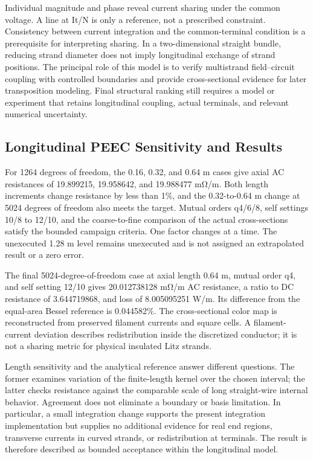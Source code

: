 \documentclass[journal,10pt]{IEEEtran}
\begin{document}
Individual magnitude and phase reveal current sharing under the common voltage. A line at It/N is only a reference, not a prescribed constraint. Consistency between current integration and the common-terminal condition is a prerequisite for interpreting sharing. In a two-dimensional straight bundle, reducing strand diameter does not imply longitudinal exchange of strand positions. The principal role of this model is to verify multistrand field–circuit coupling with controlled boundaries and provide cross-sectional evidence for later transposition modeling. Final structural ranking still requires a model or experiment that retains longitudinal coupling, actual terminals, and relevant numerical uncertainty.


\subsection*{Longitudinal PEEC Sensitivity and Results}
\hypertarget{03.peec_results.heading}{}
For 1264 degrees of freedom, the 0.16, 0.32, and 0.64 m cases give axial AC resistances of 19.899215, 19.958642, and 19.988477 mΩ/m. Both length increments change resistance by less than 1\%, and the 0.32-to-0.64 m change at 5024 degrees of freedom also meets the target. Mutual orders q4/6/8, self settings 10/8 to 12/10, and the coarse-to-fine comparison of the actual cross-sections satisfy the bounded campaign criteria. One factor changes at a time. The unexecuted 1.28 m level remains unexecuted and is not assigned an extrapolated result or a zero error.


The final 5024-degree-of-freedom case at axial length 0.64 m, mutual order q4, and self setting 12/10 gives 20.012738128 mΩ/m AC resistance, a ratio to DC resistance of 3.644719868, and loss of 8.005095251 W/m. Its difference from the equal-area Bessel reference is 0.044582\%. The cross-sectional color map is reconstructed from preserved filament currents and square cells. A filament-current deviation describes redistribution inside the discretized conductor; it is not a sharing metric for physical insulated Litz strands.


Length sensitivity and the analytical reference answer different questions. The former examines variation of the finite-length kernel over the chosen interval; the latter checks resistance against the comparable scale of long straight-wire internal behavior. Agreement does not eliminate a boundary or basis limitation. In particular, a small integration change supports the present integration implementation but supplies no additional evidence for real end regions, transverse currents in curved strands, or redistribution at terminals. The result is therefore described as bounded acceptance within the longitudinal model.
\end{document}
